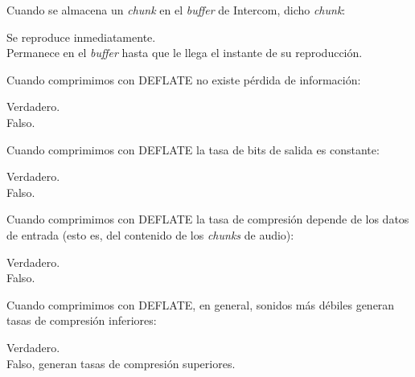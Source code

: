 \documentclass[legalpaper, 12pt, addpoints]{exam}
\begin{document}
\begin{questions}
\vspace{0.10in}

\question Cuando se almacena un \emph{chunk} en el \emph{buffer} de Intercom, dicho \emph{chunk}:

\begin{oneparchoices}
  \choice Se reproduce inmediatamente.\\
  \choice Permanece en el \emph{buffer} hasta que le llega el instante de su reproducción.
\end{oneparchoices}
  
\vspace{0.10in}

\question Cuando comprimimos con DEFLATE no existe pérdida de información:

\begin{oneparchoices}
  \choice Verdadero.\\
  \choice Falso.
\end{oneparchoices}
  
\vspace{0.10in}

\question Cuando comprimimos con DEFLATE la tasa de bits de salida es constante:

\begin{oneparchoices}
  \choice Verdadero.\\
  \choice Falso.
\end{oneparchoices}
  
\vspace{0.10in}

\question Cuando comprimimos con DEFLATE la tasa de compresión depende
de los datos de entrada (esto es, del contenido de los \emph{chunks} de
audio):

\begin{oneparchoices}
  \choice Verdadero.\\
  \choice Falso.
\end{oneparchoices}
  
\vspace{0.10in}

\question Cuando comprimimos con DEFLATE, en general, sonidos más
débiles generan tasas de compresión inferiores:

\begin{oneparchoices}
  \choice Verdadero.\\
  \choice Falso, generan tasas de compresión superiores.
\end{oneparchoices}
  
\vspace{0.10in}


\end{questions}
\end{document}
